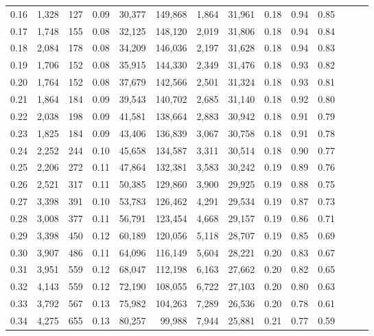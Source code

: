 \begin{tabular}{rrrrrrrrrrrrrr}
0.16 &  1,328 &  127 &  0.09 &   30,377 &  149,868 &   1,864 &  31,961 &  0.18 &  0.94 &      0.85 \\
0.17 &  1,748 &  155 &  0.08 &   32,125 &  148,120 &   2,019 &  31,806 &  0.18 &  0.94 &      0.84 \\
0.18 &  2,084 &  178 &  0.08 &   34,209 &  146,036 &   2,197 &  31,628 &  0.18 &  0.94 &      0.83 \\
0.19 &  1,706 &  152 &  0.08 &   35,915 &  144,330 &   2,349 &  31,476 &  0.18 &  0.93 &      0.82 \\
0.20 &  1,764 &  152 &  0.08 &   37,679 &  142,566 &   2,501 &  31,324 &  0.18 &  0.93 &      0.81 \\
0.21 &  1,864 &  184 &  0.09 &   39,543 &  140,702 &   2,685 &  31,140 &  0.18 &  0.92 &      0.80 \\
0.22 &  2,038 &  198 &  0.09 &   41,581 &  138,664 &   2,883 &  30,942 &  0.18 &  0.91 &      0.79 \\
0.23 &  1,825 &  184 &  0.09 &   43,406 &  136,839 &   3,067 &  30,758 &  0.18 &  0.91 &      0.78 \\
0.24 &  2,252 &  244 &  0.10 &   45,658 &  134,587 &   3,311 &  30,514 &  0.18 &  0.90 &      0.77 \\
0.25 &  2,206 &  272 &  0.11 &   47,864 &  132,381 &   3,583 &  30,242 &  0.19 &  0.89 &      0.76 \\
0.26 &  2,521 &  317 &  0.11 &   50,385 &  129,860 &   3,900 &  29,925 &  0.19 &  0.88 &      0.75 \\
0.27 &  3,398 &  391 &  0.10 &   53,783 &  126,462 &   4,291 &  29,534 &  0.19 &  0.87 &      0.73 \\
0.28 &  3,008 &  377 &  0.11 &   56,791 &  123,454 &   4,668 &  29,157 &  0.19 &  0.86 &      0.71 \\
0.29 &  3,398 &  450 &  0.12 &   60,189 &  120,056 &   5,118 &  28,707 &  0.19 &  0.85 &      0.69 \\
0.30 &  3,907 &  486 &  0.11 &   64,096 &  116,149 &   5,604 &  28,221 &  0.20 &  0.83 &      0.67 \\
0.31 &  3,951 &  559 &  0.12 &   68,047 &  112,198 &   6,163 &  27,662 &  0.20 &  0.82 &      0.65 \\
0.32 &  4,143 &  559 &  0.12 &   72,190 &  108,055 &   6,722 &  27,103 &  0.20 &  0.80 &      0.63 \\
0.33 &  3,792 &  567 &  0.13 &   75,982 &  104,263 &   7,289 &  26,536 &  0.20 &  0.78 &      0.61 \\
0.34 &  4,275 &  655 &  0.13 &   80,257 &   99,988 &   7,944 &  25,881 &  0.21 &  0.77 &      0.59 \\

\end{tabular}
